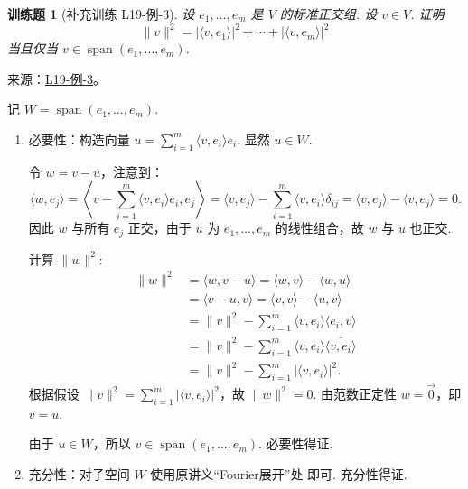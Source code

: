 \documentclass[UTF8,12pt,a4paper,fontset=fandol]{ctexart}
\newtheorem{exercise}{训练题}[section]
\begin{document}
\begin{exercise}[补充训练 L19-例-3]\label{prob:L19-例-3}
设 $e_1, \ldots , e_m$ 是 $ V $ 的标准正交组. 设 $ v \in V $. 证明
    \[ \lVert v \rVert^2 = \lvert \langle v, e_1\rangle \rvert^2 + \cdots + \lvert \langle v, e_m\rangle \rvert^2 \]
    当且仅当 $ v \in \operatorname{span}(e_1, \ldots , e_m)$.
\end{exercise}
\noindent 来源：\href{https://github.com/yhwu-is/Linear-Algebra-Left-Undone/blob/new/%E8%AE%B2%E4%B9%89/%E4%B8%93%E9%A2%98/19%20%E5%86%85%E7%A7%AF%E7%A9%BA%E9%97%B4.tex}{L19-例-3}。
\begin{solve}
记 $W = \operatorname{span}(e_1, \ldots , e_m)$.
    \begin{enumerate}
        \item 必要性：构造向量 $u = \displaystyle\sum_{i=1}^{m} \langle v, e_i \rangle e_i$. 显然 $u \in W$.

        令 $w = v - u$，注意到：
        \[
            \langle w, e_j \rangle = \left\langle v - \sum_{i=1}^{m} \langle v, e_i \rangle e_i, e_j \right\rangle = \langle v, e_j \rangle - \sum_{i=1}^{m} \langle v, e_i \rangle \delta_{ij} = \langle v, e_j \rangle - \langle v, e_j \rangle = 0.
        \]
        因此 $w$ 与所有 $e_j$ 正交，由于 $u$ 为 $e_1, \ldots , e_m$ 的线性组合，故 $w$ 与 $u$ 也正交.

        计算 $\lVert w \rVert^2$:
        \begin{align*}
            \|w\|^2 &= \langle w, v-u \rangle = \langle w, v \rangle - \langle w, u \rangle \\
            &= \langle v-u, v \rangle = \langle v, v \rangle - \langle u, v \rangle \\
            &= \|v\|^2 - \sum_{i=1}^{m} \langle v, e_i \rangle \langle e_i, v \rangle \\
            &= \|v\|^2 - \sum_{i=1}^{m} \langle v, e_i \rangle \overline{\langle v, e_i \rangle} \\
            &= \|v\|^2 - \sum_{i=1}^{m} |\langle v, e_i \rangle|^2.
        \end{align*}
        根据假设 $\lVert v \rVert^2 = \displaystyle\sum_{i=1}^{m} \lvert \langle v, e_i \rangle \rvert^2$，故 $\lVert w \rVert^2 = 0$.
        由范数正定性 $w = \vec{0}$，即 $v = u$.

        由于 $u \in W$，所以 $v \in \operatorname{span}(e_1, \ldots , e_m)$. 必要性得证.

        \item 充分性：对子空间 $W$ 使用原讲义“Fourier展开”处 即可. 充分性得证.
    \end{enumerate}
\end{solve}
\end{document}
